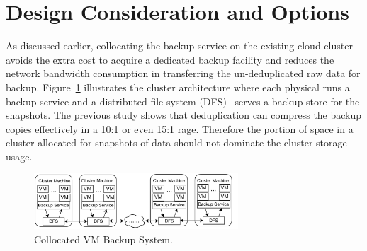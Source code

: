 \section{Design Consideration and Options}
\label{sect:options}

As discussed earlier, collocating the backup service on the existing
cloud cluster avoids the extra cost to acquire a dedicated backup facility
and reduces the network bandwidth consumption in transferring the un-deduplicated
raw data for backup. 
Figure~\ref{fig:collocated} illustrates the cluster architecture where
each physical runs a backup service and a distributed file system (DFS)~\cite{GFS2004,Hadoop} 
serves a backup store  for the snapshots.
The previous study shows that 
 deduplication can compress the backup copies 
effectively in a 10:1 or even 15:1 rage. 
Therefore  the portion of space in a cluster
allocated for snapshots of data should not dominate
the cluster storage usage.





\begin{figure}[htb]
    \centering
    \includegraphics[width=3in]{images/colocated-arch}
    \caption{Collocated VM Backup System.}
    \label{fig:collocated}
\end{figure}



